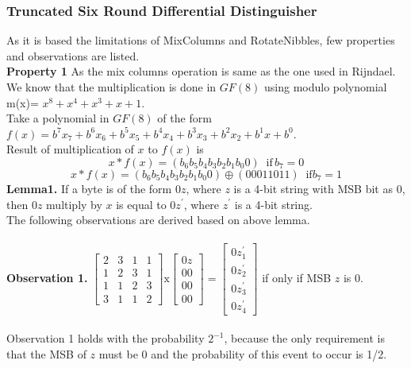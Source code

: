 \documentclass[preprint]{transcrypto}
\begin{document}
\subsubsection{Truncated Six Round Differential Distinguisher}
As it is based the limitations of MixColumns and RotateNibbles, few properties and observations are listed.\\
\textbf{Property 1} As the mix columns operation is same as the one used in Rijndael. We know that the multiplication is done in $GF(8)$ using modulo polynomial m(x)= $x^{8} + x^{4} + x^{3} + x + 1$.\\
Take a polynomial in $GF(8)$ of the form $f(x) = b^{7} x_{7} + b^{6} x_{6} + b^{5} x_{5} + b^{4} x_{4} + b^{3} x_{3} + b^{2} x_{2} + b^{1} x + b^{0}$.\\
Result of multiplication of $x$ to $f(x)$ is\\
$$x * f(x) = (b_{6} b_{5} b_{4} b_{3} b_{2} b_{1} b_{0} 0)\;\; \text{if}\,b_{7}=0$$ 
$$ x * f(x) = (b_{6} b_{5} b_{4} b_{3} b_{2} b_{1} b_{0} 0) \oplus (00011011) \;\; \text{if} b_{7} = 1$$ 
\textbf{Lemma1.} If a byte is of the form $0z$, where $z$ is a 4-bit string
with MSB bit as 0, then $0z$ multiply by $x$ is equal to $0z^{'}$, where $z ^{'}$
is a 4-bit string.\\
The following observations are derived based on above lemma.\\ \\
\textbf{Observation 1.} 
\begin{math}
\begin{bmatrix}
2&3&1&1\\
1&2&3&1\\
1&1&2&3\\
3&1&1&2
\end{bmatrix}
\text{x}
\begin{bmatrix}
0z \\
00 \\
00 \\
00 
\end{bmatrix} = 
\begin{bmatrix}
0z^{'}_{1} \\
0z^{'}_{2} \\
0z^{'}_{3} \\
0z^{'}_{4} 
\end{bmatrix}
\end{math} if only if MSB $z$ is 0. \\ \\
Observation 1 holds with the probability $2^{-1}$, because the only requirement is that the MSB of $z$ must be 0 and the probability of this event to occur is 1/2.\\ \\
\end{document}
